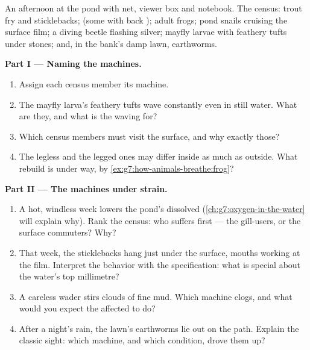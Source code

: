 \begin{problem}\label{pb:g7:how-animals-breathe:1}
An afternoon at the pond with net, viewer box and
notebook. The census: trout fry and sticklebacks; 
(some with back ); adult frogs; pond snails cruising
the surface film; a diving beetle flashing silver; mayfly
larvae with feathery tufts under stones; and, in the bank's
damp lawn, earthworms.

\medskip\noindent\textbf{Part I --- Naming the machines.}
\begin{enumerate}
  \item Assign each census member its  machine.
  \item The mayfly larva's feathery tufts wave constantly
        even in still water. What are they, and what is
        the waving for?
  \item Which census members must visit the surface, and
        why exactly those?
  \item The legless  and the legged ones may
        differ inside as much as outside. What rebuild is
        under way, by
        \cref{ex:g7:how-animals-breathe:frog}?
\end{enumerate}

\medskip\noindent\textbf{Part II --- The machines under
strain.}
\begin{enumerate}[resume]
  \item A hot, windless week lowers the pond's dissolved
         (\cref{ch:g7:oxygen-in-the-water} will
        explain why). Rank the census: who suffers first
        --- the gill-users, or the surface commuters?
        Why?
  \item That week, the sticklebacks hang just under the
        surface, mouths working at the film. Interpret
        the behavior with the specification: what is
        special about the water's top millimetre?
  \item A careless wader stirs clouds of fine mud. Which
        machine clogs, and what would you expect the
        affected  to do?
  \item After a night's rain, the lawn's earthworms lie
        out on the path. Explain the classic sight:
        which machine, and which condition, drove them
        up?
\end{enumerate}


\end{problem}
